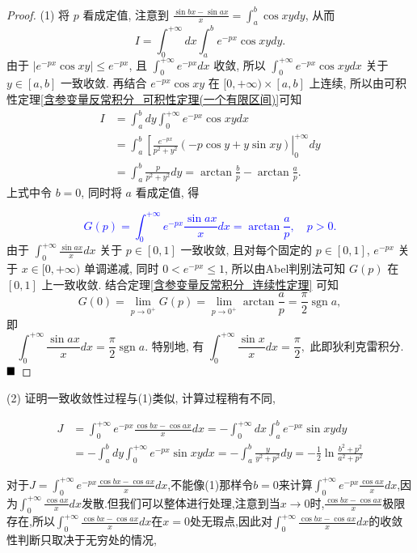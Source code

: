 \documentclass[lang=cn,newtx,10pt,scheme=chinese]{elegantbook}
\begin{document}
\begin{proof}
(1) 将 $p$ 看成定值, 注意到 $\frac{\sin bx - \sin ax}{x} = \int_{a}^{b} \cos xy dy$, 从而
$$ I = \int_{0}^{+\infty} dx \int_{a}^{b} e^{-px} \cos xy dy. $$
由于 $|e^{-px} \cos xy| \le e^{-px}$, 且 $\int_{0}^{+\infty} e^{-px} dx$ 收敛, 所以 $\int_{0}^{+\infty} e^{-px} \cos xy dx$ 关于 $y \in [a, b]$ 一致收敛. 再结合 $e^{-px} \cos xy$ 在 $[0, +\infty) \times [a, b]$ 上连续, 所以由可积性定理\ref{含参变量反常积分_可积性定理(一个有限区间)}可知
\begin{align*}
I &= \int_{a}^{b} dy \int_{0}^{+\infty} e^{-px} \cos xy dx \\
&= \int_{a}^{b} \left[\frac{e^{-px}}{p^2 + y^2}(-p \cos y + y \sin xy)\right|_{0}^{+\infty} dy \\
&= \int_{a}^{b} \frac{p}{p^2 + y^2} dy = \arctan\frac{b}{p} - \arctan\frac{a}{p}.
\end{align*}
上式中令 $b=0$, 同时将 $a$ 看成定值, 得

\textcolor{blue}{$$ G(p) = \int_{0}^{+\infty} e^{-px} \frac{\sin ax}{x} dx = \arctan \frac{a}{p}, \quad p>0. $$}
由于 $\int_{0}^{+\infty} \frac{\sin ax}{x} dx$ 关于 $p \in [0, 1]$ 一致收敛, 且对每个固定的 $p \in [0, 1]$, $e^{-px}$ 关于 $x \in [0, +\infty)$ 单调递减, 同时 $0 < e^{-px} \le 1$, 所以由Abel判别法可知 $G(p)$ 在 $[0, 1]$ 上一致收敛. 结合定理\ref{含参变量反常积分_连续性定理} 可知
$$ G(0) = \lim\limits_{p \to 0^+} G(p) = \lim\limits_{p \to 0^+} \arctan \frac{a}{p} = \frac{\pi}{2} \operatorname{sgn} a, $$
即
$$ \int_{0}^{+\infty} \frac{\sin ax}{x} dx = \frac{\pi}{2} \operatorname{sgn} a. \text{ 特别地, 有 } \int_{0}^{+\infty} \frac{\sin x}{x} dx = \frac{\pi}{2}, \text{ 此即狄利克雷积分.} $$
$\hfill \blacksquare$
\end{proof}

(2) 证明一致收敛性过程与(1)类似, 计算过程稍有不同,

\begin{align*}
    J &= \int_{0}^{+\infty} e^{-px} \frac{\cos bx - \cos ax}{x} dx = - \int_{0}^{+\infty} dx \int_{a}^{b}e^{-px} \sin xy dy \\
    &= -\int_{a}^{b}dy \int_{0}^{+\infty}e^{-px} \sin xy dx = -\int_{a}^{b}\frac{y}{y^2 + p^2} dy = -\frac{1}{2}\ln \frac{b^2 + p^2 }{a^2+ p^2}
\end{align*}

对于$J = \int_{0}^{+\infty} e^{-px} \frac{\cos bx - \cos ax}{x} dx$,不能像(1)那样令$b=0$来计算$\int_{0}^{+\infty} e^{-px} \frac{\cos ax}{x} dx$,因为$\int_{0}^{+\infty} \frac{\cos ax}{x} dx$发散.但我们可以整体进行处理,注意到当$x \to 0$时,$\frac{\cos bx - \cos ax}{x}$极限存在,所以$\int_{0}^{+\infty} \frac{\cos bx - \cos ax}{x} dx$在$x=0$处无瑕点,因此对$\int_{0}^{+\infty} \frac{\cos bx - \cos ax}{x} dx$的收敛性判断只取决于无穷处的情况,
\end{document}
